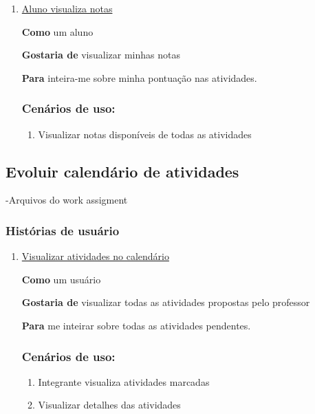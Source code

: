 \begin{enumerate}
\item \underline{Aluno visualiza notas}

\textbf{Como} um aluno

\textbf{Gostaria de} visualizar minhas notas

\textbf{Para} inteira-me sobre minha pontuação nas atividades.
\subsubsection*{Cenários de uso:}
\begin{enumerate}
\item Visualizar notas disponíveis de todas as atividades
\end{enumerate}

\end{enumerate}

\subsection{Evoluir calendário de atividades}
	-Arquivos do work assigment

\subsubsection*{Histórias de usuário}
\begin{enumerate}
\item \underline{Visualizar atividades no calendário}

\textbf{Como} um usuário

\textbf{Gostaria de} visualizar todas as atividades propostas pelo professor

\textbf{Para} me inteirar sobre todas as atividades pendentes.

\subsubsection*{Cenários de uso:}
\begin{enumerate}
\item Integrante visualiza atividades marcadas
\item Visualizar detalhes das atividades

\end{enumerate}
\end{enumerate}

